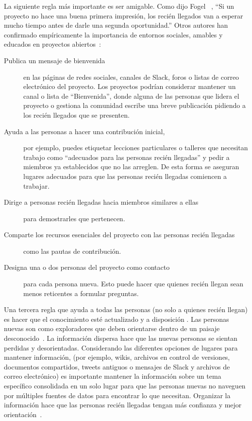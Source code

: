La siguiente regla más importante es ser amigable.
Como dijo Fogel ~\cite{Foge2005},
``Si un proyecto no hace una buena primera impresión,
los recién llegados van a esperar mucho tiempo antes de darle una segunda oportunidad.''
Otros autores han confirmado empíricamente la importancia de entornos sociales, amables y educados
en proyectos abiertos~\cite{Sing2012,Stei2013,Stei2018}:

\begin{description}

\item[Publica un mensaje de bienvenida]
  en las páginas de redes sociales, canales de Slack, foros o listas de correo electrónico del proyecto.
  Los proyectos podrían considerar mantener un canal o lista de ``Bienvenida'',
  donde alguna de las personas que lidera el proyecto o gestiona la comunidad escribe una breve publicación pidiendo a los recién llegados que se presenten.

\item[Ayuda a las personas a hacer una contribución inicial,]
por ejemplo, puedes etiquetar lecciones particulares o talleres que necesitan trabajo como ``adecuados para las personas recién llegadas''
  y pedir a miembros ya establecidos que no las arreglen. De esta forma se aseguran
  lugares adecuados para que las personas recién llegadas comiencen a trabajar.

\item[Dirige a personas recién llegadas hacia miembros similares a ellas]
  para demostrarles que pertenecen.

\item[Comparte los recursos esenciales del proyecto con las personas recién llegadas]
  como las pautas de contribución.

\item[Designa una o dos personas del proyecto como contacto]
  para cada persona nueva.
  Esto puede hacer que quienes recién llegan sean menos reticentes a formular preguntas.

\end{description}

Una tercera regla que ayuda a todas las personas (no solo a quienes recién llegan)
es hacer que el conocimiento esté actualizado y a disposición .
Las personas nuevas son como exploradores que deben orientarse dentro de un paisaje desconocido~\cite{Dage2010}.
La información dispersa hace que las nuevas personas se sientan perdidas y desorientadas.
Considerando  las diferentes opciones de lugares para mantener información, 
(por ejemplo, wikis, archivos en control de versiones, documentos compartidos, tweets antiguos o mensajes de Slack y archivos de correo electrónico)
es importante mantener la información sobre un tema específico consolidada en un solo lugar
para que las personas nuevas no naveguen por múltiples fuentes de datos para encontrar lo que necesitan.
Organizar la información hace que las personas recién llegadas tengan más confianza y mejor orientación~\cite{Stei2016}.

